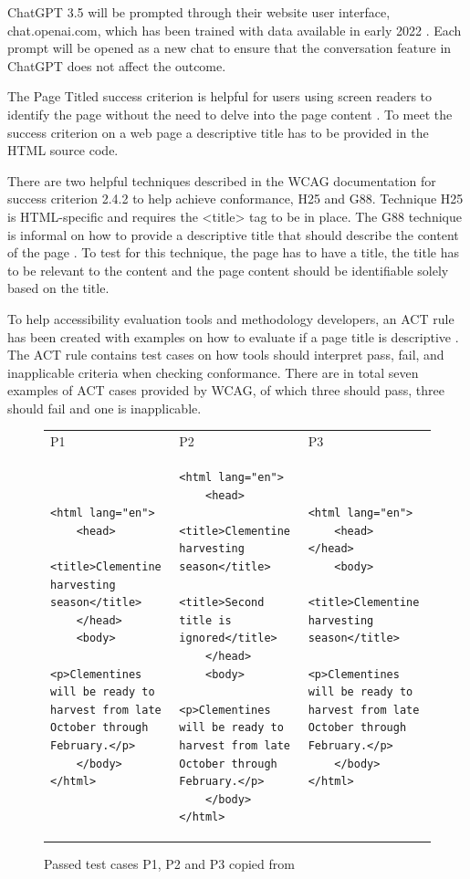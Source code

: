 ChatGPT 3.5 will be prompted through their website user interface, chat.openai.com, which has been trained with data available in early 2022 \citep{openai_35}. Each prompt will be opened as a new chat to ensure that the conversation feature in ChatGPT does not affect the outcome.

The Page Titled success criterion is helpful for users using screen readers to identify the page without the need to delve into the page content \citep{wcag_page_titled}. To meet the success criterion on a web page a descriptive title has to be provided in the HTML source code. 

There are two helpful techniques described in the WCAG documentation for success criterion 2.4.2 to help achieve conformance, H25 and G88. Technique H25 is HTML-specific and requires the <title> tag to be in place. The G88 technique is informal on how to provide a descriptive title that should describe the content of the page \citep{g88}. To test for this technique, the page has to have a title, the title has to be relevant to the content and the page content should be identifiable solely based on the title.

To help accessibility evaluation tools and methodology developers, an ACT rule has been created with examples on how to evaluate if a page title is descriptive \citep{act_rule_g88}. The ACT rule contains test cases on how tools should interpret pass, fail, and inapplicable criteria when checking conformance. There are in total seven examples of ACT cases provided by WCAG, of which three should pass, three should fail and one is inapplicable.

\begin{figure}[htbp]
\begin{tabular}{|p{4.9cm}|p{4.9cm}|p{4.9cm}|}
P1 & P2 & P3 \\
\begin{lstlisting}
<html lang="en">
	<head>
		<title>Clementine harvesting season</title>
	</head>
	<body>
		<p>Clementines will be ready to harvest from late October through February.</p>
	</body>
</html>
\end{lstlisting}&
\begin{lstlisting}
<html lang="en">
	<head>
		<title>Clementine harvesting season</title>
		<title>Second title is ignored</title>
	</head>
	<body>
		<p>Clementines will be ready to harvest from late October through February.</p>
	</body>
</html>
\end{lstlisting}&
\begin{lstlisting}
<html lang="en">
	<head> </head>
	<body>
		<title>Clementine harvesting season</title>
		<p>Clementines will be ready to harvest from late October through February.</p>
	</body>
</html>
\end{lstlisting}
\end{tabular}
\caption{Passed test cases P1, P2 and P3 copied from \textcite{act_rule_g88}}
\label{passed_cases}
\end{figure}

